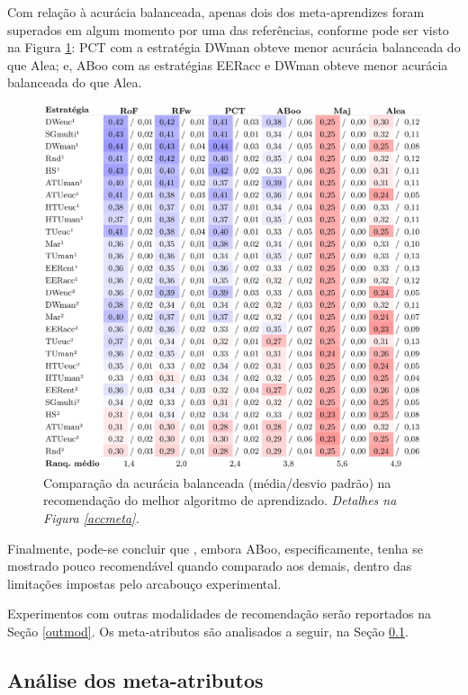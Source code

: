 Com relação à acurácia balanceada, apenas dois dos meta-aprendizes foram superados em algum momento por uma das referências, conforme pode ser visto na Figura \ref{accbalmeta}:
PCT com a estratégia DWman obteve menor acurácia balanceada do que Alea; e, ABoo com as estratégias EERacc e DWman obteve menor acurácia balanceada do que Alea.
\begin{figure}
\centering
\includegraphics[scale=0.4]{images/metaacb.pdf}
\caption[Comparação da acurácia balanceada na recomendação do melhor algoritmo de aprendizado.]{Comparação da acurácia balanceada (média/desvio padrão) na recomendação do melhor algoritmo de aprendizado.
\textit{Detalhes na Figura \ref{accmeta}.}}
\label{accbalmeta}
\end{figure}

Finalmente, pode-se concluir que , embora ABoo, especificamente, tenha se mostrado pouco recomendável quando comparado aos demais, dentro das limitações impostas pelo arcabouço experimental.

Experimentos com outras modalidades de recomendação serão reportados na Seção \ref{outmod}.
Os meta-atributos são analisados a seguir, na Seção \ref{metaatts}.

\subsection{Análise dos meta-atributos}\label{metaatts}

